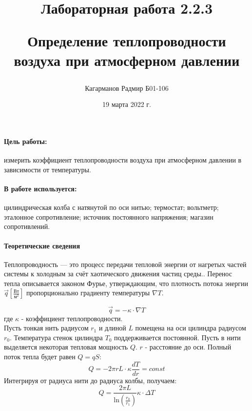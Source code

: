 \documentclass[a4paper,12pt]{article}
\title{Лабораторная работа 2.2.3 

Определение теплопроводности воздуха при атмосферном давлении}
\author{Кагарманов Радмир Б01-106}
\date{19 марта 2022 г.}
\begin{document}
\maketitle
\newpage
\paragraph{Цель работы:} измерить коэффициент теплопроводности воздуха при атмосферном давлении в зависимости от температуры.
\paragraph{В работе используется:}цилиндрическая колба с натянутой по оси нитью; термостат; вольтметр; эталонное сопротивление; источник
постоянного напряжения; магазин сопротивлений.

\paragraph{Теоретические сведения \\}

Теплопроводность — это процесс передачи тепловой энергии от нагретых частей системы к холодным за счёт хаотического движения частиц среды.. Перенос тепла описывается законом Фурье, утверждающим, что плотность потока энергии $\Vec{q} [\frac{\text{Вт}}{\text{м}^2}]$ пропорционально градиенту температуры $\nabla T$.

\begin{equation}
    \Vec{q}=-\kappa \cdot \nabla T
\end{equation}
где $\kappa$ - коэффициент теплопроводности. \\

Пусть тонкая нить радиусом $r_1$ и длиной $L$ помещена на оси цилиндра радиусом $r_0$. Температура стенок цилиндра $T_0$ поддерживается постоянной. Пусть в нити выделяется некоторая тепловая мощность $Q$. $r$ - расстояние до оси. Полный поток тепла будет равен $Q=qS$:
\begin{equation}
    Q=-2\pi rL \cdot \kappa \frac{dT}{dr}=const
\end{equation}
Интегрируя от радиуса нити до радиуса колбы, получаем:
\begin{equation}
    Q=\frac{2\pi L }{\text{ln}(\frac{r_0}{r_1})}\kappa \cdot \Delta T
\end{equation}
\end{document}
